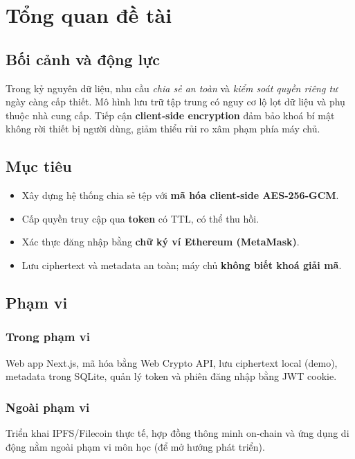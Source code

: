 \chapter{Tổng quan đề tài}

\section{Bối cảnh và động lực}
Trong kỷ nguyên dữ liệu, nhu cầu \textit{chia sẻ an toàn} và \textit{kiểm soát quyền riêng tư} ngày càng cấp thiết. Mô hình lưu trữ tập trung có nguy cơ lộ lọt dữ liệu và phụ thuộc nhà cung cấp. Tiếp cận \textbf{client‑side encryption} đảm bảo khoá bí mật không rời thiết bị người dùng, giảm thiểu rủi ro xâm phạm phía máy chủ.

\section{Mục tiêu}
\begin{itemize}
  \item Xây dựng hệ thống chia sẻ tệp với \textbf{mã hóa client‑side AES‑256‑GCM}.
  \item Cấp quyền truy cập qua \textbf{token} có TTL, có thể thu hồi.
  \item Xác thực đăng nhập bằng \textbf{chữ ký ví Ethereum (MetaMask)}.
  \item Lưu ciphertext và metadata an toàn; máy chủ \textbf{không biết khoá giải mã}.
\end{itemize}

\section{Phạm vi}
\subsection*{Trong phạm vi}
Web app Next.js, mã hóa bằng Web Crypto API, lưu ciphertext local (demo), metadata trong SQLite, quản lý token và phiên đăng nhập bằng JWT cookie.

\subsection*{Ngoài phạm vi}
Triển khai IPFS/Filecoin thực tế, hợp đồng thông minh on‑chain và ứng dụng di động nằm ngoài phạm vi môn học (để mở hướng phát triển).

